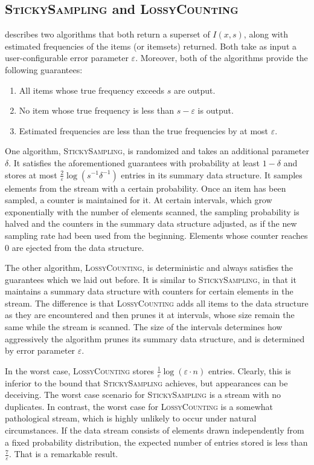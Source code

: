 \documentclass[a4paper]{article}
\begin{document}
\subsection{\textsc{StickySampling} and \textsc{LossyCounting}}
\cite{Manku02approximatefrequency} describes two algorithms that both return a superset of $I(x, s)$, along with estimated frequencies of the items (or itemsets) returned. Both take as input a user-configurable error parameter $\varepsilon$. Moreover, both of the algorithms provide the following guarantees:
\begin{enumerate}
\item All items whose true frequency exceeds $s$ are output.
\item No item whose true frequency is less than $s - \varepsilon$ is output.
\item Estimated frequencies are less than the true frequencies by at most $\varepsilon$.
\end{enumerate}

One algorithm, \textsc{StickySampling}, is randomized and takes an additional parameter $\delta$. It satisfies the aforementioned guarantees with probability at least $1-\delta$ and stores at most $\frac{2}{\varepsilon}\log (s^{-1}\delta^{-1})$ entries in its summary data structure. It samples elements from the stream with a certain probability. Once an item has been sampled, a counter is maintained for it. At certain intervals, which grow exponentially with the number of elements scanned, the sampling probability is halved and the counters in the summary data structure adjusted, as if the new sampling rate had been used from the beginning. Elements whose counter reaches 0 are ejected from the data structure.

The other algorithm, \textsc{LossyCounting}, is deterministic and always satisfies the guarantees which we laid out before. It is similar to \textsc{StickySampling}, in that it maintains a summary data structure with counters for certain elements in the stream. The difference is that \textsc{LossyCounting} adds all items to the data structure as they are encountered and then prunes it at intervals, whose size remain the same while the stream is scanned. The size of the intervals determines how aggressively the algorithm prunes its summary data structure, and is determined by error parameter $\varepsilon$. 

In the worst case, \textsc{LossyCounting} stores $\frac{1}{\varepsilon}\log (\varepsilon \cdot n)$ entries. Clearly, this is inferior to the bound that \textsc{StickySampling} achieves, but appearances can be deceiving. The worst case scenario for \textsc{StickySampling} is a stream with no duplicates. In contrast, the worst case for \textsc{LossyCounting} is a somewhat pathological stream, which is highly unlikely to occur under natural circumstances. If the data stream consists of elements drawn independently from a fixed probability distribution, the expected number of entries stored is less than $\frac{7}{\varepsilon}$. That is a remarkable result.
\end{document}
